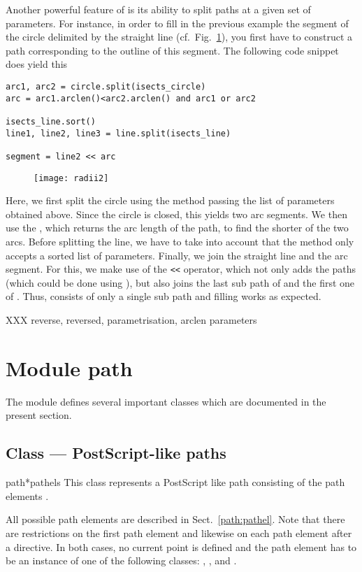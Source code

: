 Another powerful feature of \PyX{} is its ability to split paths at a
given set of parameters. For instance, in order to fill in the
previous example the segment of the circle delimited by the straight
line (cf.\ Fig.~\ref{fig:radii2}), you first have to construct a path
corresponding to the outline of this segment. The following code
snippet does yield this 
\begin{verbatim}
arc1, arc2 = circle.split(isects_circle)
arc = arc1.arclen()<arc2.arclen() and arc1 or arc2

isects_line.sort()
line1, line2, line3 = line.split(isects_line)

segment = line2 << arc
\end{verbatim}
\begin{figure}
\centerline{\texttt{[image: radii2]}}
\label{fig:radii2}
\end{figure}
Here, we first split the circle using the  method passing
the list of parameters obtained above. Since the circle is closed,
this yields two arc segments. We then use the , which
returns the arc length of the path, to find the shorter of the two
arcs. Before splitting the line, we have to take into account that
the  method only accepts a sorted list of parameters.
Finally, we join the straight line and the arc segment. For
this, we make use of the \verb|<<| operator, which not only adds
the paths (which could be done using ), but also
joins the last sub path of  and the first one of
. Thus,  consists of only a single sub path
and filling works as expected.

XXX reverse, reversed, parametrisation, arclen parameters


\section{Module path}

The  module defines several important classes which are
documented in the present section.

\subsection{Class  --- PostScript-like paths}


\begin{classdesc}{path}{*pathels}
This class represents a PostScript like path consisting of the
path elements .

All possible path elements are described in Sect.~\ref{path:pathel}.
Note that there are restrictions on the first path element and likewise
on each path element after a  directive. In both cases,
no current point is defined and the path element has to be an instance
of one of the following classes: , , and
.
\end{classdesc}

